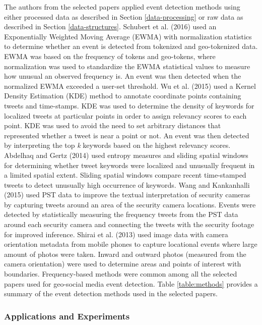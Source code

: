 The authors from the selected papers applied event detection methods using either processed data as described in Section \ref{data-processing} or raw data as described in Section \ref{data-structures}. Schubert et al. (2016) \cite{Schubert:2016} used an Exponentially Weighted Moving Average (EWMA) with normalization statistics to determine whether an event is detected from tokenized and geo-tokenized data. EWMA was based on the frequency of tokens and geo-tokens, where normalization was used to standardize the EWMA statistical values to measure how unusual an observed frequency is. An event was then detected when the normalized EWMA exceeded a user-set threshold. Wu et al. (2015) \cite{Wu:2015} used a Kernel Density Estimation (KDE) method to annotate coordinate points containing tweets and time-stamps. KDE was used to determine the density of keywords for localized tweets at particular points in order to assign relevancy scores to each point. KDE was used to avoid the need to set arbitrary distances that represented whether a tweet is near a point or not. An event was then detected by interpreting the top \textit{k} keywords based on the highest relevancy scores. Abdelhaq and Gertz (2014) \cite{Abdelhaq:2014} used entropy measures and sliding spatial windows for determining whether tweet keywords were localized and unusually frequent in a limited spatial extent. Sliding spatial windows compare recent time-stamped tweets to detect unusually high occurrence of keywords. Wang and Kankanhalli (2015) \cite{Wang:2015} used PST data to improve the textual interpretation of security cameras by capturing tweets around an area of the security camera locations. Events were detected by statistically measuring the frequency tweets from the PST data around each security camera and connecting the tweets with the security footage for improved inference. Shirai et al. (2013) \cite{Shirai:2013} used image data with camera orientation metadata from mobile phones to capture locational events where large amount of photos were taken. Inward and outward photos (measured from the camera orientation) were used to determine areas and points of interest with boundaries. Frequency-based methods were common among all the selected papers used for geo-social media event detection. Table \ref{table:methods} provides a summary of the event detection methods used in the selected papers.

\subsubsection{Applications and Experiments} \label{applications-and-experiments}

